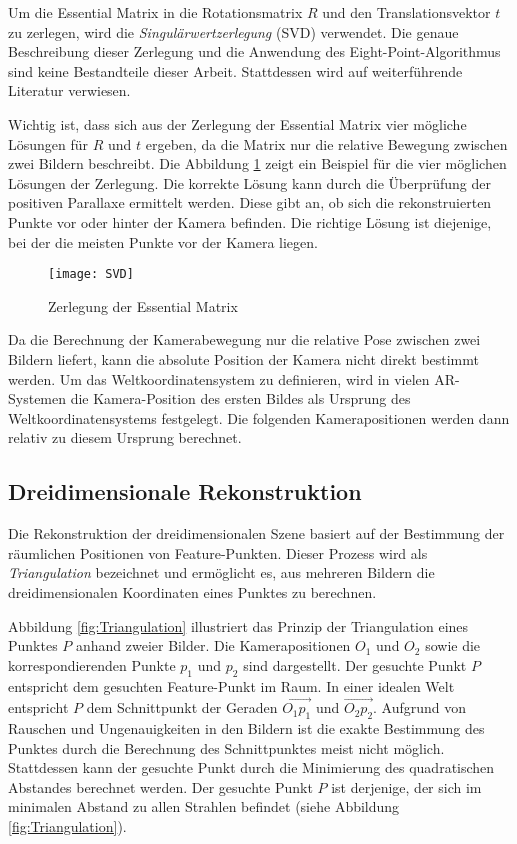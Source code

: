 Um die Essential Matrix in die Rotationsmatrix \( R \) und den Translationsvektor \( t \) zu zerlegen, wird die \emph{Singulärwertzerlegung} (SVD) verwendet. Die genaue Beschreibung dieser Zerlegung und die Anwendung des Eight-Point-Algorithmus sind keine Bestandteile dieser Arbeit. Stattdessen wird auf weiterführende Literatur verwiesen. \cite{gao2021vSLAM, tsai1984svd, hartley1997eightpoint}

Wichtig ist, dass sich aus der Zerlegung der Essential Matrix vier mögliche Lösungen für \( R \) und \( t \) ergeben, da die Matrix nur die relative Bewegung zwischen zwei Bildern beschreibt. Die Abbildung \ref{fig:SVD} zeigt ein Beispiel für die vier möglichen Lösungen der Zerlegung. Die korrekte Lösung kann durch die Überprüfung der positiven Parallaxe ermittelt werden. Diese gibt an, ob sich die rekonstruierten Punkte vor oder hinter der Kamera befinden. Die richtige Lösung ist diejenige, bei der die meisten Punkte vor der Kamera liegen. \cite{gao2021vSLAM}

\begin{figure}
    \centering
    \texttt{[image: SVD]}
    \caption{Zerlegung der Essential Matrix \cite{gao2021vSLAM}\label{fig:SVD}}\par
\end{figure}

Da die Berechnung der Kamerabewegung nur die relative Pose zwischen zwei Bildern liefert, kann die absolute Position der Kamera nicht direkt bestimmt werden. Um das Weltkoordinatensystem zu definieren, wird in vielen AR-Systemen die Kamera-Position des ersten Bildes als Ursprung des Weltkoordinatensystems festgelegt. Die folgenden Kamerapositionen werden dann relativ zu diesem Ursprung berechnet. \cite{gao2021vSLAM,appledevdoc}

\subsection{Dreidimensionale Rekonstruktion}

Die Rekonstruktion der dreidimensionalen Szene basiert auf der Bestimmung der räumlichen Positionen von Feature-Punkten. Dieser Prozess wird als \emph{Triangulation} bezeichnet und ermöglicht es, aus mehreren Bildern die dreidimensionalen Koordinaten eines Punktes zu berechnen. \cite{gao2021vSLAM}

Abbildung \ref{fig:Triangulation} illustriert das Prinzip der Triangulation eines Punktes \( P \) anhand zweier Bilder. Die Kamerapositionen \( O_1 \) und \( O_2 \) sowie die korrespondierenden Punkte \( p_1 \) und \( p_2 \) sind dargestellt. Der gesuchte Punkt \( P \) entspricht dem gesuchten Feature-Punkt im Raum. In einer idealen Welt entspricht \( P \) dem Schnittpunkt der Geraden \( \overrightarrow{O_1p_1} \) und \( \overrightarrow{O_2p_2} \). Aufgrund von Rauschen und Ungenauigkeiten in den Bildern ist die exakte Bestimmung des Punktes durch die Berechnung des Schnittpunktes meist nicht möglich. Stattdessen kann der gesuchte Punkt durch die Minimierung des quadratischen Abstandes berechnet werden. Der gesuchte Punkt \( P \) ist derjenige, der sich im minimalen Abstand zu allen Strahlen befindet (siehe Abbildung \ref{fig:Triangulation}). \cite{gao2021vSLAM}

